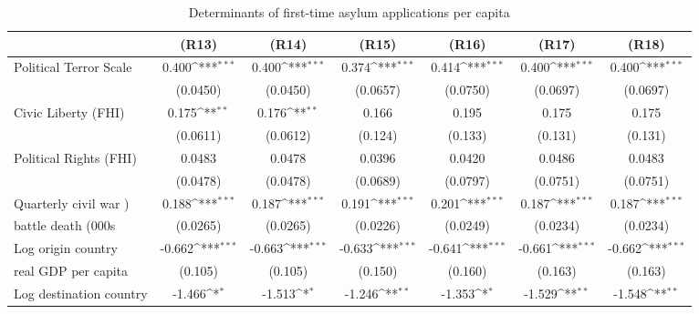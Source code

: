 \begin{table}[htbp]\centering \scriptsize
\def\sym#1{\ifmmode^{#1}\else\(^{#1}\)\fi}
\caption{Determinants of first-time asylum applications per capita}
\begin{tabular}{l*{6}{c}}
\hline\hline
                    &\multicolumn{1}{c}{(R13)}         &\multicolumn{1}{c}{(R14)}         &\multicolumn{1}{c}{(R15)}         &\multicolumn{1}{c}{(R16)}         &\multicolumn{1}{c}{(R17)}         &\multicolumn{1}{c}{(R18)}         \\
\hline
Political Terror Scale&       0.400\sym{***}&       0.400\sym{***}&       0.374\sym{***}&       0.414\sym{***}&       0.400\sym{***}&       0.400\sym{***}\\
                    &    (0.0450)         &    (0.0450)         &    (0.0657)         &    (0.0750)         &    (0.0697)         &    (0.0697)         \\
[0,5em]
Civic Liberty (FHI) &       0.175\sym{**} &       0.176\sym{**} &       0.166         &       0.195         &       0.175         &       0.175         \\
                    &    (0.0611)         &    (0.0612)         &     (0.124)         &     (0.133)         &     (0.131)         &     (0.131)         \\
[0,5em]
Political Rights (FHI)&      0.0483         &      0.0478         &      0.0396         &      0.0420         &      0.0486         &      0.0483         \\
                    &    (0.0478)         &    (0.0478)         &    (0.0689)         &    (0.0797)         &    (0.0751)         &    (0.0751)         \\
[0,5em]
Quarterly civil war )&       0.188\sym{***}&       0.187\sym{***}&       0.191\sym{***}&       0.201\sym{***}&       0.187\sym{***}&       0.187\sym{***}\\
battle death (000s                    &    (0.0265)         &    (0.0265)         &    (0.0226)         &    (0.0249)         &    (0.0234)         &    (0.0234)         \\
[0,5em]
Log origin country &      -0.662\sym{***}&      -0.663\sym{***}&      -0.633\sym{***}&      -0.641\sym{***}&      -0.661\sym{***}&      -0.662\sym{***}\\
real GDP per capita                    &     (0.105)         &     (0.105)         &     (0.150)         &     (0.160)         &     (0.163)         &     (0.163)         \\
[0,5em]
Log destination country&      -1.466\sym{*}  &      -1.513\sym{*}  &      -1.246\sym{**} &      -1.353\sym{*}  &      -1.529\sym{**} &      -1.548\sym{**} \\

\end{tabular}
\end{table}
